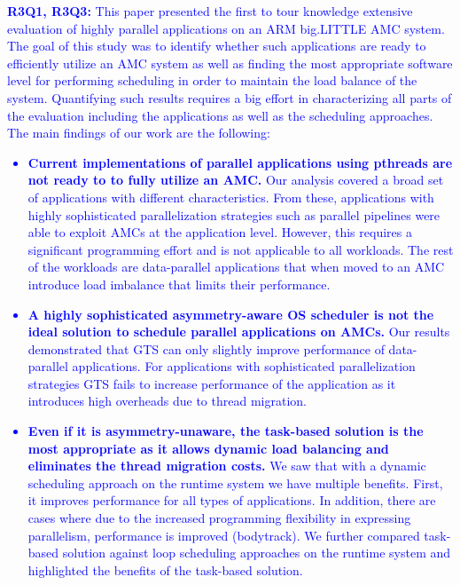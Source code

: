 \textcolor{blue}{
\textbf{R3Q1, R3Q3:} This paper presented the first to tour knowledge extensive evaluation of highly parallel applications on an ARM big.LITTLE AMC system.
The goal of this study was to identify whether such applications are ready to efficiently utilize an AMC system as well as finding the most appropriate software level for performing scheduling in order to maintain the load balance of the system. 
Quantifying such results requires a big effort in characterizing all parts of the evaluation including the applications as well as the scheduling approaches. 
The main findings of our work are the following:
\begin{itemize}
	\item \textbf{Current implementations of parallel applications using pthreads are not ready to to fully utilize an AMC.}
	Our analysis covered a broad set of applications with different characteristics. 
	From these, applications with highly sophisticated parallelization strategies such as parallel pipelines were able to exploit AMCs at the application level.
	However, this requires a significant programming effort and is not applicable to all workloads.
	The rest of the workloads are data-parallel applications that when moved to an AMC introduce load imbalance that limits their performance. 
	\item \textbf{A highly sophisticated asymmetry-aware OS scheduler is not the ideal solution to schedule parallel applications on AMCs.}
	Our results demonstrated that GTS can only slightly improve performance of data-parallel applications. For applications with sophisticated parallelization strategies GTS fails to increase performance of the application as it introduces high overheads due to thread migration.
	\item \textbf{Even if it is asymmetry-unaware, the task-based solution is the most appropriate as it allows dynamic load balancing and eliminates the thread migration costs.}
	We saw that with a dynamic scheduling approach on the runtime system we have multiple benefits. 
	First, it improves performance for all types of applications. 
	In addition, there are cases where due to the increased programming flexibility in expressing parallelism, performance is improved (bodytrack).
	We further compared task-based solution against loop scheduling approaches on the runtime system and highlighted the benefits of the task-based solution.
\end{itemize}
}

